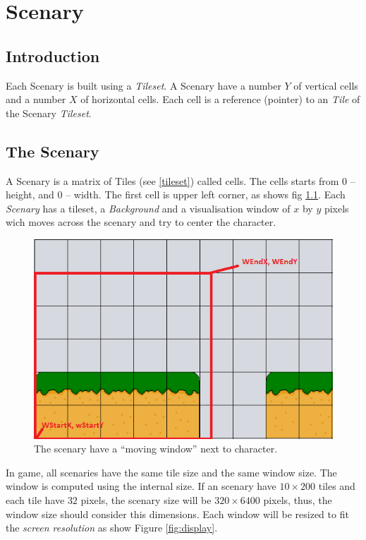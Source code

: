 \chapter{Scenary}

	\section{Introduction}
		Each Scenary is built using a \emph{Tileset}. A Scenary have a number $Y$ of vertical cells and a number $X$ of horizontal cells. Each cell is a reference (pointer) to an \emph{Tile} of the Scenary \emph{Tileset}.
	\section{The Scenary}
		A Scenary is a matrix of Tiles (see \ref{tileset}) called cells. The cells starts from 0 -- height, and 0 -- width. The first cell is upper left corner, as shows fig \ref{fig:scenary}. Each \emph{Scenary} has a tileset, a \emph{Background} and  a visualisation window of $x$ by $y$ pixels wich moves across the scenary and try to center the character. 
		
		\begin{figure}[H]
			\centering
			\includegraphics[width=\textwidth]{img/scenary.png}
			\caption{The scenary have a ``moving window'' next to character.}
			\label{fig:scenary}
		\end{figure}
		
		In  game, all scenaries have the same tile size and the same window size. The window is computed using the internal size. If an scenary have $10 \times 200$ tiles and each tile have $32$ pixels, the scenary size will be $320 \times 6400$ pixels, thus, the window size should consider this dimensions. Each window will be resized to fit the \emph{screen resolution} as show Figure \ref{fig:display}.
		

